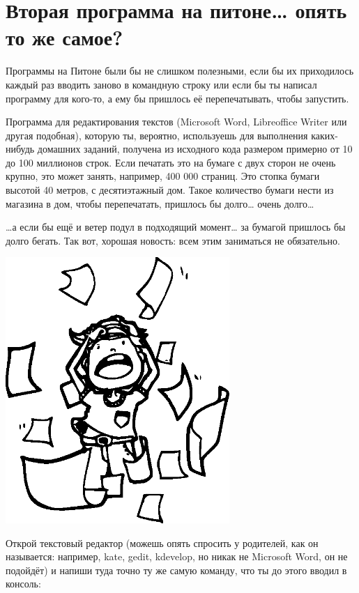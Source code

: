 \section{Вторая программа на питоне… опять то же самое?}

Программы на Питоне были бы не слишком полезными, если бы их приходилось каждый раз вводить заново в командную строку или если бы ты написал программу для кого-то, а ему бы пришлось её перепечатывать, чтобы запустить.

Программа для редактирования текстов (Microsoft Word, Libreoffice Writer или другая подобная), которую ты, вероятно, используешь для выполнения каких-нибудь домашних заданий, получена из исходного кода размером примерно от 10 до 100 миллионов строк. Если печатать это на бумаге с двух сторон не очень крупно, это может занять, например, 400 000 страниц. Это стопка бумаги высотой 40 метров, с десятиэтажный дом. Такое количество бумаги нести из магазина в дом, чтобы перепечатать, пришлось бы долго… очень долго…

…а если бы ещё и ветер подул в подходящий момент… за бумагой пришлось бы долго бегать. Так вот, хорошая новость: всем этим заниматься не обязательно.

\begin{center}
\includegraphics*[width=85mm]{../en/pullinghair.eps}
\end{center}

Открой текстовый редактор (можешь опять спросить у родителей, как он называется: например, kate, gedit, kdevelop, но никак не Microsoft Word, он не подойдёт) и напиши туда точно ту же самую команду, что ты до этого вводил в консоль:

